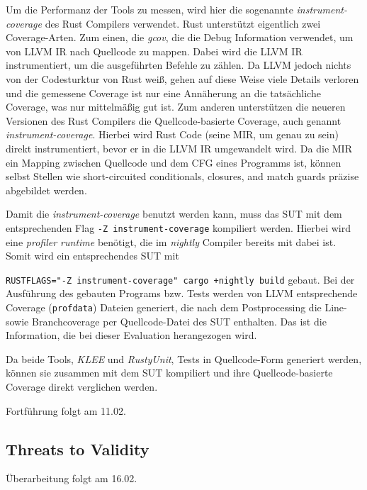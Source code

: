 \documentclass{article}
\begin{document}
Um die Performanz der Tools zu messen, wird hier die sogenannte \textit{instrument-coverage} des Rust Compilers verwendet. Rust unterstützt eigentlich zwei Coverage-Arten. Zum einen, die \textit{gcov}, die die Debug Information verwendet, um von LLVM IR nach Quellcode zu mappen. Dabei wird die LLVM IR instrumentiert, um die ausgeführten Befehle zu zählen. Da LLVM jedoch nichts von der Codesturktur von Rust weiß, gehen auf diese Weise viele Details verloren und die gemessene Coverage ist nur eine Annäherung an die tatsächliche Coverage, was nur mittelmäßig gut ist. Zum anderen unterstützen die neueren Versionen des Rust Compilers die Quellcode-basierte Coverage, auch genannt \textit{instrument-coverage}. Hierbei wird Rust Code (seine MIR, um genau zu sein) direkt instrumentiert, bevor er in die LLVM IR umgewandelt wird. Da die MIR ein Mapping zwischen Quellcode und dem CFG eines Programms ist, können selbst Stellen wie short-circuited conditionals, closures, and match guards präzise abgebildet werden.

Damit die \textit{instrument-coverage} benutzt werden kann, muss das SUT mit dem entsprechenden Flag \lstinline{-Z instrument-coverage} kompiliert werden. Hierbei wird eine \textit{profiler runtime} benötigt, die im \textit{nightly} Compiler bereits mit dabei ist. Somit wird ein entsprechendes SUT mit \raggedright\lstinline{RUSTFLAGS="-Z instrument-coverage" cargo +nightly build} gebaut. Bei der Ausführung des gebauten Programs bzw. Tests werden von LLVM entsprechende Coverage (\lstinline{profdata}) Dateien generiert, die nach dem Postprocessing die Line- sowie Branchcoverage per Quellcode-Datei des SUT enthalten. Das ist die Information, die bei dieser Evaluation herangezogen wird.

Da beide Tools, \textit{KLEE} und \textit{RustyUnit}, Tests in Quellcode-Form generiert werden, können sie zusammen mit dem SUT kompiliert und ihre Quellcode-basierte Coverage direkt verglichen werden.

Fortführung folgt am 11.02.


\subsection{Threats to Validity}
Überarbeitung folgt am 16.02.
\end{document}
